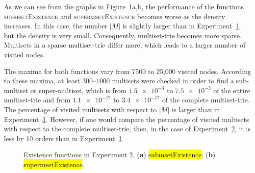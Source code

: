 \documentclass[algorithms,article,accept,pdftex,moreauthors]{Definitions/mdpi}
\begin{document}
As we can see from the graphs in Figure~\ref{fig:e2m1}a,b, 
the performance of the functions \textsc{submsetExistence} and 
\textsc{supermsetExistence} becomes worse as the density increases. 
In this case, the number $|M|$ is slightly larger than in 
Experiment~\hyperref[s:exp1]{1}, but the density is very small. Consequently, 
multiset-trie becomes more sparse. Multisets in a sparse multiset-trie differ more, 
which leads to a larger number of visited nodes. 

The maxima for both functions vary from 7500 to 25,000 visited nodes. According 
to these maxima, at least 300--1000 multisets were checked in order to find a 
sub-multiset or super-multiset, which is from $\num{1.5e-3}$ to $\num{7.5e-3}$ of the entire 
multiset-trie and from $\num{1.1e-17}$ to $\num{3.4e-17}$ of the complete 
multiset-trie. The percentage of visited multisets with respect to $|M|$ is 
larger than in Experiment~\hyperref[s:exp1]{1}. However, if one would compare 
the percentage of visited multisets with respect to the complete multiset-trie, then, 
in the case of Experiment~\hyperref[s:exp2]{2}, it is less by 10 orders than in 
Experiment~\hyperref[s:exp1]{1}.

\begin{figure}[H]
\caption{Existence functions in Experiment 2. (\textbf{a}) \hl{submsetExistence}; (\textbf{b}) \hl{supermsetExistence}.\label{fig:e2m1}}
\end{figure}
\end{document}
